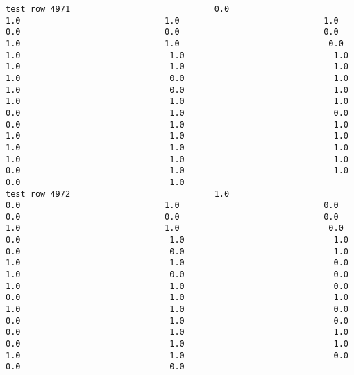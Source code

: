\documentclass[11pt]{article}
\begin{document}
\begin{verbatim}
test row 4971                             0.0                             1.0                             1.0                             1.0                             0.0                             0.0                             0.0                             1.0                             1.0                              0.0                              1.0                              1.0                              1.0                              1.0                              1.0                              1.0                              1.0                              0.0                              1.0                              1.0                              0.0                              1.0                              1.0                              1.0                              1.0                              0.0                              1.0                              0.0                              0.0                              1.0                              1.0                              1.0                              1.0                              1.0                              1.0                              1.0                              1.0                              1.0                              1.0                              1.0                              0.0                              1.0                              1.0                              0.0                              1.0
test row 4972                             1.0                             0.0                             1.0                             0.0                             0.0                             0.0                             0.0                             1.0                             1.0                              0.0                              0.0                              1.0                              1.0                              0.0                              0.0                              1.0                              1.0                              1.0                              0.0                              1.0                              0.0                              0.0                              1.0                              1.0                              0.0                              0.0                              1.0                              1.0                              1.0                              1.0                              0.0                              0.0                              1.0                              0.0                              0.0                              1.0                              1.0                              0.0                              1.0                              1.0                              1.0                              1.0                              0.0                              0.0                              0.0

\end{verbatim}
\end{document}
